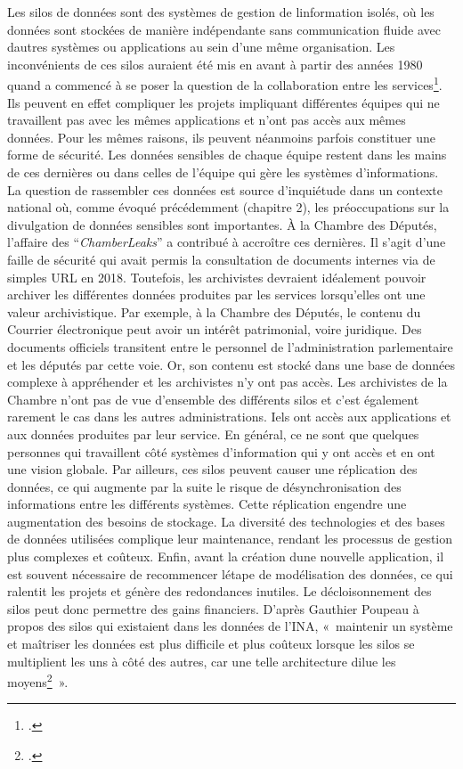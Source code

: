Les silos de données sont des systèmes de gestion de
l\textquotesingle information isolés, où les données sont stockées de
manière indépendante sans communication fluide avec
d\textquotesingle autres systèmes ou applications au sein d'une même
organisation. Les inconvénients de ces silos auraient été mis en avant à
partir des années 1980 quand a commencé à se poser la question de la
collaboration entre les services\footcite{bygstad_it_2015}. Ils peuvent en effet compliquer les projets impliquant
différentes équipes qui ne travaillent pas avec les mêmes applications
et n'ont pas accès aux mêmes données. Pour les mêmes raisons, ils
peuvent néanmoins parfois constituer une forme de sécurité. Les données
sensibles de chaque équipe restent dans les mains de ces dernières ou dans celles de l'équipe qui gère les systèmes d'informations. La
question de rassembler ces données est source d'inquiétude dans un
contexte national où, comme évoqué précédemment (chapitre 2), les
préoccupations sur la divulgation de données sensibles sont importantes.
À la Chambre des Députés, l'affaire des \enquote{\emph{ChamberLeaks}} a contribué à accroître ces dernières. Il s'agit d'une faille de sécurité qui avait permis la consultation de documents internes via de simples URL en 2018. Toutefois, les archivistes devraient idéalement pouvoir archiver les
différentes données produites par les services lorsqu'elles ont une
valeur archivistique. Par exemple, à la Chambre des Députés, le contenu
du Courrier électronique peut avoir un intérêt
patrimonial, voire juridique. Des documents officiels transitent entre
le personnel de l'administration parlementaire et les députés par cette
voie. Or, son contenu est stocké dans une base de données complexe à
appréhender et les archivistes n'y ont pas accès. Les archivistes de la
Chambre n'ont pas de vue d'ensemble des différents silos et c'est également
rarement le cas dans les autres administrations. Iels ont accès aux
applications et aux données produites par leur service. En général, ce
ne sont que quelques personnes qui travaillent côté systèmes d'information
qui y ont accès et en ont une vision globale. Par ailleurs, ces silos
peuvent causer une réplication des données, ce qui augmente par la suite le
risque de désynchronisation des informations entre les différents
systèmes. Cette réplication engendre une augmentation des besoins de
stockage. La diversité des technologies et des bases de données
utilisées complique leur maintenance, rendant les processus de gestion
plus complexes et coûteux. Enfin, avant la création
d\textquotesingle une nouvelle application, il est souvent nécessaire de
recommencer l\textquotesingle étape de modélisation des données, ce qui
ralentit les projets et génère des redondances inutiles. Le
décloisonnement des silos peut donc permettre des gains financiers.
D'après Gauthier Poupeau à propos des silos qui existaient dans les
données de l'INA, «~maintenir un système et maîtriser les données est
plus difficile et plus coûteux lorsque les silos se multiplient les uns
à côté des autres, car une telle architecture dilue les
moyens\footcite{poupeau__2024}~».

